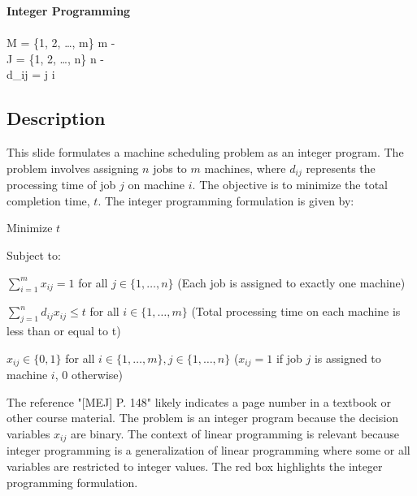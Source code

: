 \documentclass{article}%
\begin{document}
\textbf{Integer Programming} \\
\underline{} \quad {} \\
M = \{1, 2, \dots, m\} \quad m -  \\
J = \{1, 2, \dots, n\} \quad n -  \\
d_{ij} =  j  i \\
%
\subsection{Description}%
This slide formulates a machine scheduling problem as an integer program.  The problem involves assigning $n$ jobs to $m$ machines, where $d_{ij}$ represents the processing time of job $j$ on machine $i$. The objective is to minimize the total completion time, $t$. The integer programming formulation is given by:

Minimize $t$

Subject to:

$\sum_{i=1}^{m} x_{ij} = 1$ for all $j \in \{1, \dots, n\}$ (Each job is assigned to exactly one machine)

$\sum_{j=1}^{n} d_{ij} x_{ij} \le t$ for all $i \in \{1, \dots, m\}$ (Total processing time on each machine is less than or equal to t)

$x_{ij} \in \{0, 1\}$ for all $i \in \{1, \dots, m\}, j \in \{1, \dots, n\}$ ($x_{ij} = 1$ if job $j$ is assigned to machine $i$, 0 otherwise)

The reference "[MEJ] P. 148" likely indicates a page number in a textbook or other course material. The problem is an integer program because the decision variables $x_{ij}$ are binary. The context of linear programming is relevant because integer programming is a generalization of linear programming where some or all variables are restricted to integer values.  The red box highlights the integer programming formulation.%
\end{document}
